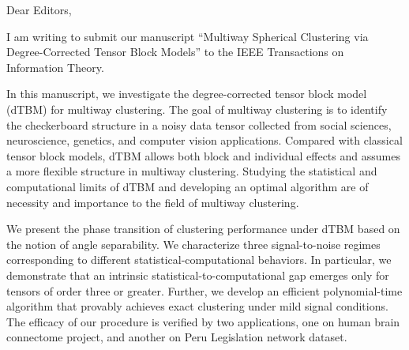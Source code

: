 \documentclass{article}[12pt]
\begin{document}
Dear Editors, 

I am writing to submit our manuscript ``Multiway Spherical Clustering via Degree-Corrected Tensor Block Models'' to the IEEE Transactions on Information Theory.

In this manuscript, we investigate the degree-corrected tensor block model (dTBM) for multiway clustering. The goal of multiway clustering is to identify the checkerboard structure in a noisy data tensor collected from social sciences, neuroscience, genetics, and computer vision applications. Compared with classical tensor block models, dTBM allows both block and individual effects and assumes a more flexible structure in multiway clustering. Studying the statistical and computational limits of dTBM and developing an optimal algorithm are of necessity and importance to the field of multiway clustering.

We present the phase transition of clustering performance under dTBM based on the notion of angle separability. We characterize three signal-to-noise regimes corresponding to different statistical-computational behaviors. In particular, we demonstrate that an intrinsic statistical-to-computational gap emerges only for tensors of order three or greater. Further, we develop an efficient polynomial-time algorithm that provably achieves exact clustering under mild signal conditions. The efficacy of our procedure is verified by two applications, one on human brain connectome project, and another on Peru Legislation network dataset.
\end{document}
